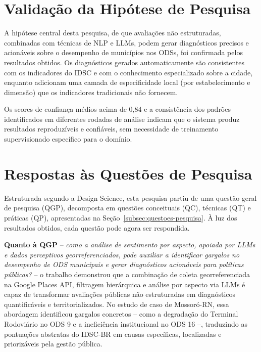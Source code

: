 \section{Validação da Hipótese de Pesquisa}
\label{sec:validacao-hipotese}

A hipótese central desta pesquisa, de que avaliações não estruturadas, combinadas com técnicas de \gls{NLP} e \glspl{LLM}, podem gerar diagnósticos precisos e acionáveis sobre o desempenho de municípios nos \glspl{ODS}, foi confirmada pelos resultados obtidos. Os diagnósticos gerados automaticamente são consistentes com os indicadores do \gls{IDSC} e com o conhecimento especializado sobre a cidade, enquanto adicionam uma camada de especificidade local (por estabelecimento e dimensão) que os indicadores tradicionais não fornecem.

Os scores de confiança médios acima de 0,84 e a consistência dos padrões identificados em diferentes rodadas de análise indicam que o sistema produz resultados reproduzíveis e confiáveis, sem necessidade de treinamento supervisionado específico para o domínio.

\section{Respostas às Questões de Pesquisa}
\label{sec:respostas-questoes}

Estruturada segundo a Design Science, esta pesquisa partiu de uma questão geral de pesquisa (QGP), decomposta em questões conceituais (QC), técnicas (QT) e práticas (QP), apresentadas na Seção~\ref{subsec:questoes-pesquisa}. À luz dos resultados obtidos, cada questão pode agora ser respondida.

\textbf{Quanto à QGP} -- \textit{como a análise de sentimento por aspecto, apoiada por \glspl{LLM} e dados perceptivos georreferenciados, pode auxiliar a identificar gargalos no desempenho de ODS municipais e gerar diagnósticos acionáveis para políticas públicas?} -- o trabalho demonstrou que a combinação de coleta georreferenciada na Google Places API, filtragem hierárquica e análise por aspecto via \glspl{LLM} é capaz de transformar avaliações públicas não estruturadas em diagnósticos quantificáveis e territorializados. No estudo de caso de Mossoró-RN, essa abordagem identificou gargalos concretos -- como a degradação do Terminal Rodoviário no ODS 9 e a ineficiência institucional no ODS 16 --, traduzindo as pontuações abstratas do IDSC-BR em causas específicas, localizadas e priorizáveis pela gestão pública.


